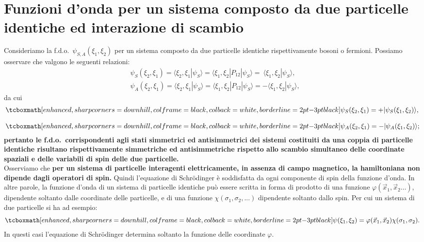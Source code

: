 \section{Funzioni d'onda per un sistema  composto da due particelle identiche  ed interazione di scambio}
Consideriamo la f.d.o.~$\psi_{S,A} (\xi_1 ,\xi_2)$ per un sistema composto da due particelle identiche rispettivamente bosoni o fermioni. Possiamo osservare che valgono le seguenti relazioni:
	\begin{align}
		& \psi_S (\xi_2, \xi_1) =\langle \xi_2, \xi_1|\psi_S\rangle= \langle \xi_1, \xi_2|P_{12}|\psi_S\rangle=~\langle \xi_1, \xi_2|\psi_S \rangle  , \\[0.3cm] 
		& \psi_A (\xi_2, \xi_1) =\langle \xi_2, \xi_1|\psi_S\rangle= \langle \xi_1, \xi_2|P_{12}|\psi_S\rangle=-\langle \xi_1, \xi_2|\psi_S\rangle ,
	\end{align}
da cui
	\begin{align}
		&\tcboxmath[enhanced, sharp corners=downhill, colframe=black, colback=white, borderline={2pt}{-3pt}{black}]{
			\psi_S (\xi_2, \xi_1) = +|\psi_S(\xi_1, \xi_2)\rangle ,
		}\\[0.3cm]
		&\tcboxmath[enhanced, sharp corners=downhill, colframe=black, colback=white, borderline={2pt}{-3pt}{black}]{
			\psi_A (\xi_2, \xi_1) = -|\psi_A(\xi_1, \xi_2)\rangle ;
		}
	\end{align}
\textbf{pertanto le f.d.o.~corrispondenti agli stati simmetrici ed antisimmetrici dei sistemi costituiti da una coppia di particelle identiche risultano rispettivamente simmetriche ed antisimmetriche rispetto allo scambio simultaneo delle coordinate spaziali e delle variabili di spin delle due particelle.}\\

Osserviamo che \textbf{per un sistema di particelle interagenti elettricamente, in assenza di campo magnetico, la hamiltoniana non dipende dagli operatori di spin.} Quindi l'equazione di Schr\"{o}dinger è soddisfatta da ogni componente di spin della funzione d'onda. In altre parole, la funzione d'onda di un sistema di particelle identiche può essere scritta in forma di prodotto di una funzione $\varphi(\vec{x}_1, \vec{x}_2...)$, dipendente soltanto dalle coordinate delle particelle, e di una funzione $\chi(\sigma_1,\sigma_2,...)$ dipendente soltanto dallo spin. Per cui un sistema di due particelle si ha ad esempio:
	\begin{equation}
		\tcboxmath[enhanced, sharp corners=downhill, colframe=black, colback=white, borderline={2pt}{-3pt}{black}]{
			\psi(\xi_1, \xi_2)= \varphi(\vec{x}_1, \vec{x}_2)\chi(\sigma_1, \sigma_2) .
			}
	\end{equation}
In questi casi l'equazione di Schr\"{o}dinger determina soltanto la funzione delle coordinate $\varphi$.\\

